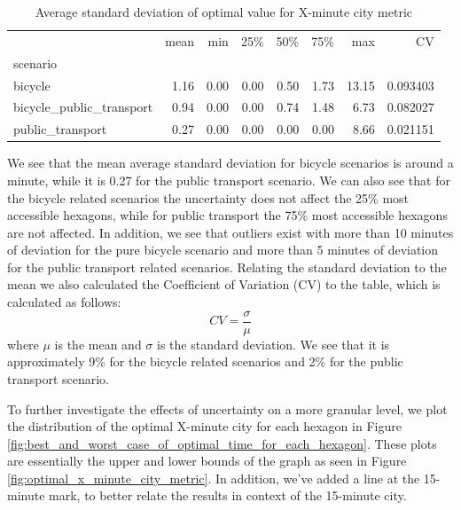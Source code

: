 \begin{table}
  \caption{Average standard deviation of optimal value for X-minute city metric}
  \label{tab:average_standard_deviation_of_optimal_value_for_x_minute_city_metric}
  \begin{center}
    \begin{tabular}{lrrrrrrr}
     & mean & min & 25\% & 50\% & 75\% & max & CV \\
    scenario &  &  &  &  &  &  &  \\
    bicycle & 1.16 & 0.00 & 0.00 & 0.50 & 1.73 & 13.15 & 0.093403 \\
    bicycle_public_transport & 0.94 & 0.00 & 0.00 & 0.74 & 1.48 & 6.73 & 0.082027 \\
    public_transport & 0.27 & 0.00 & 0.00 & 0.00 & 0.00 & 8.66 & 0.021151 \\
    \end{tabular}
  \end{center}
\end{table}


We see that the mean average standard deviation for bicycle scenarios is around a minute, while it is 0.27 for the public transport scenario.
We can also see that for the bicycle related scenarios the uncertainty does not affect the 25\% most accessible hexagons, while for public transport the 75\% most accessible hexagons are not affected.
In addition, we see that outliers exist with more than 10 minutes of deviation for the pure bicycle scenario and more than 5 minutes of deviation for the public transport related scenarios.
Relating the standard deviation to the mean we also calculated the Coefficient of Variation (CV) to the table, which is calculated as follows:
$$ CV = \frac{\sigma}{\mu} $$
where $\mu$ is the mean and $\sigma$ is the standard deviation.
We see that it is approximately 9\% for the bicycle related scenarios and 2\% for the public transport scenario.

To further investigate the effects of uncertainty on a more granular level, we plot the distribution of the optimal X-minute city for each hexagon in Figure \ref{fig:best_and_worst_case_of_optimal_time_for_each_hexagon}.
These plots are essentially the upper and lower bounds of the graph as seen in Figure \ref{fig:optimal_x_minute_city_metric}.
In addition, we've added a line at the 15-minute mark, to better relate the results in context of the 15-minute city.


